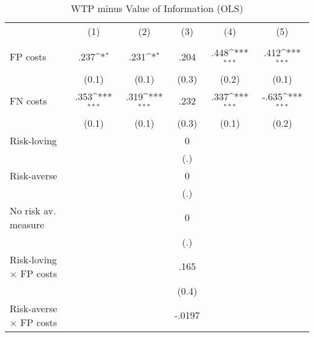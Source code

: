 \begin{table}[htbp]\centering
\def\sym#1{\ifmmode^{#1}\else\(^{#1}\)\fi}
\caption{WTP minus Value of Information (OLS)}
\begin{tabular}{l*{5}{c}}
\hline\hline
                &\multicolumn{1}{c}{(1)}&\multicolumn{1}{c}{(2)}&\multicolumn{1}{c}{(3)}&\multicolumn{1}{c}{(4)}&\multicolumn{1}{c}{(5)}\\
                &\multicolumn{1}{c}{}&\multicolumn{1}{c}{}&\multicolumn{1}{c}{}&\multicolumn{1}{c}{}&\multicolumn{1}{c}{}\\
\hline
FP costs        &     .237\sym{*}  &     .231\sym{*}  &     .204         &     .448\sym{***}&     .412\sym{***}\\
                &    (0.1)         &    (0.1)         &    (0.3)         &    (0.2)         &    (0.1)         \\
FN costs        &     .353\sym{***}&     .319\sym{***}&     .232         &     .337\sym{***}&    -.635\sym{***}\\
                &    (0.1)         &    (0.1)         &    (0.3)         &    (0.1)         &    (0.2)         \\
Risk-loving     &                  &                  &        0         &                  &                  \\
                &                  &                  &      (.)         &                  &                  \\
Risk-averse     &                  &                  &        0         &                  &                  \\
                &                  &                  &      (.)         &                  &                  \\
No risk av. measure&                  &                  &        0         &                  &                  \\
                &                  &                  &      (.)         &                  &                  \\
Risk-loving $\times$ FP costs&                  &                  &     .165         &                  &                  \\
                &                  &                  &    (0.4)         &                  &                  \\
Risk-averse $\times$ FP costs&                  &                  &   -.0197         &                  &                  \\

\end{tabular}
\end{table}
